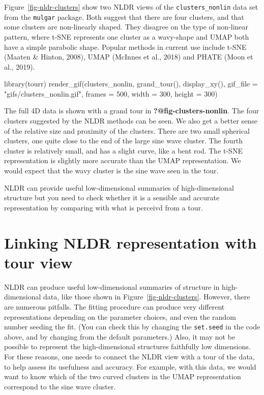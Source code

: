 \documentclass[
  letterpaper,
]{krantz}
\newenvironment{Shaded}{\begin{snugshade}}{\end{snugshade}}
\newcommand{\AttributeTok}[1]{\textcolor[rgb]{0.40,0.45,0.13}{#1}}
\newcommand{\DecValTok}[1]{\textcolor[rgb]{0.68,0.00,0.00}{#1}}
\newcommand{\FunctionTok}[1]{\textcolor[rgb]{0.28,0.35,0.67}{#1}}
\newcommand{\NormalTok}[1]{\textcolor[rgb]{0.00,0.23,0.31}{#1}}
\newcommand{\StringTok}[1]{\textcolor[rgb]{0.13,0.47,0.30}{#1}}
\begin{document}
Figure~\ref{fig-nldr-clusters} show two NLDR views of the
\texttt{clusters\_nonlin} data set from the \texttt{mulgar} package.
Both suggest that there are four clusters, and that some clusters are
non-linearly shaped. They disagree on the type of non-linear pattern,
where t-SNE represents one cluster as a wavy-shape and UMAP both have a
simple parabolic shape. Popular methods in current use include t-SNE
(Maaten \& Hinton, 2008), UMAP (McInnes et al., 2018) and PHATE (Moon et
al., 2019).

\begin{Shaded}
\begin{Highlighting}[]
\FunctionTok{library}\NormalTok{(tourr)}
\FunctionTok{render\_gif}\NormalTok{(clusters\_nonlin, }
           \FunctionTok{grand\_tour}\NormalTok{(),}
           \FunctionTok{display\_xy}\NormalTok{(),}
           \AttributeTok{gif\_file =} \StringTok{"gifs/clusters\_nonlin.gif"}\NormalTok{,}
           \AttributeTok{frames =} \DecValTok{500}\NormalTok{,}
           \AttributeTok{width =} \DecValTok{300}\NormalTok{, }
           \AttributeTok{height =} \DecValTok{300}\NormalTok{)}
\end{Highlighting}
\end{Shaded}

The full 4D data is shown with a grand tour in
\textbf{?@fig-clusters-nonlin}. The four clusters suggested by the NLDR
methods can be seen. We also get a better sense of the relative size and
proximity of the clusters. There are two small spherical clusters, one
quite close to the end of the large sine wave cluster. The fourth
cluster is relatively small, and has a slight curve, like a bent rod.
The t-SNE representation is slightly more accurate than the UMAP
representation. We would expect that the wavy cluster is the sine wave
seen in the tour.

NLDR can provide useful low-dimensional summaries of high-dimensional
structure but you need to check whether it is a sensible and accurate
representation by comparing with what is perceivd from a tour.

\hypertarget{linking-nldr-representation-with-tour-view}{%
\section{Linking NLDR representation with tour
view}\label{linking-nldr-representation-with-tour-view}}

NLDR can produce useful low-dimensional summaries of structure in
high-dimensional data, like those shown in
Figure~\ref{fig-nldr-clusters}. However, there are numerous pitfalls.
The fitting procedure can produce very different representations
depending on the parameter choices, and even the random number seeding
the fit. (You can check this by changing the \texttt{set.seed} in the
code above, and by changing from the default parameters.) Also, it may
not be possible to represent the high-dimensional structures faithfully
low dimensions. For these reasons, one needs to connect the NLDR view
with a tour of the data, to help assess its usefulness and accuracy. For
example, with this data, we would want to know which of the two curved
clusters in the UMAP representation correspond to the sine wave cluster.
\end{document}
